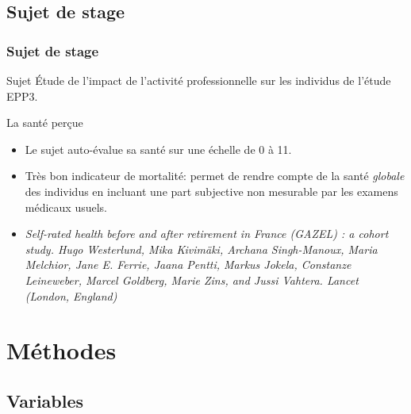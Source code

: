 \documentclass{beamer}
\begin{document}
\subsection{Sujet de stage}

\begin{frame}
\frametitle{Sujet de stage}

\pause
\begin{beamerboxesrounded}[upper = titre, lower = texte, shadow = true]{Sujet}
\pause
Étude de l'impact de l'activité professionnelle sur les individus de l'étude EPP3.\end{beamerboxesrounded}

\pause
\begin{beamerboxesrounded}[upper = titre, lower = texte, shadow = true]{La santé perçue}
\pause
\begin{itemize}
\item Le sujet auto-évalue sa santé sur une échelle de 0 à 11.
\pause
\item Très bon indicateur de mortalité: permet de rendre compte de la santé \textit{globale} des individus en incluant une part subjective non mesurable par les examens médicaux usuels.
\pause
\item \textit{Self-rated health before and after retirement in France (GAZEL) : a cohort study.
\tiny{Hugo Westerlund, Mika Kivimäki, Archana Singh-Manoux, Maria Melchior, Jane E. Ferrie,
Jaana Pentti, Markus Jokela, Constanze Leineweber, Marcel Goldberg, Marie Zins, and Jussi
Vahtera.} 
Lancet (London, England)}
\end{itemize}
\end{beamerboxesrounded}

\end{frame}

\section{Méthodes}
\subsection{Variables}
\end{document}
